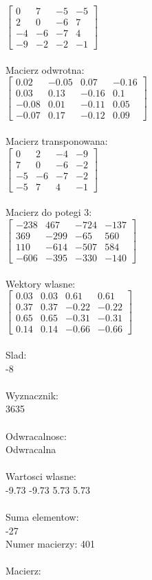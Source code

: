 \documentclass[a4paper,12pt]{article}
\begin{document}
$\begin{bmatrix} 0&7&-5&-5\\2&0&-6&7\\-4&-6&-7&4\\-9&-2&-2&-1 \end{bmatrix}$
\\
\\
Macierz odwrotna:\\

$\begin{bmatrix} 0.02&-0.05&0.07&-0.16\\0.03&0.13&-0.16&0.1\\-0.08&0.01&-0.11&0.05\\-0.07&0.17&-0.12&0.09 \end{bmatrix}$
\\
\\
Macierz transponowana:\\

$\begin{bmatrix} 0&2&-4&-9\\7&0&-6&-2\\-5&-6&-7&-2\\-5&7&4&-1 \end{bmatrix}$
\\
\\
Macierz do potegi 3:\\

$\begin{bmatrix} -238&467&-724&-137\\369&-299&-65&560\\110&-614&-507&584\\-606&-395&-330&-140 \end{bmatrix}$
\\
\\
Wektory wlasne:\\

$\begin{bmatrix} 0.03&0.03&0.61&0.61\\0.37&0.37&-0.22&-0.22\\0.65&0.65&-0.31&-0.31\\0.14&0.14&-0.66&-0.66 \end{bmatrix}$
\\
\\
Slad:\\
-8
\\
\\
Wyznacznik:\\
3635
\\
\\
Odwracalnosc:\\
Odwracalna
\\
\\
Wartosci wlasne:\\
-9.73 -9.73 5.73 5.73
\\
\\
Suma elementow:\\
-27
\\
\newpage
Numer macierzy:
401
\\
\\
Macierz:\\
\end{document}
